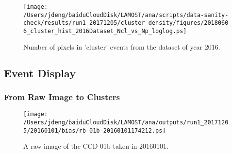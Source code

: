 \documentclass[12pt,twoside,letterpaper]{article}
\begin{document}
   \begin{figure}[!htbp]
   \begin{center}
       \texttt{[image: /Users/jdeng/baiduCloudDisk/LAMOST/ana/scripts/data-sanity-check/results/run1\_20171205/cluster\_density/figures/20180606\_cluster\_hist\_2016Dataset\_Ncl\_vs\_Np\_loglog.ps]}
       \caption{Number of pixels in 'cluster' events from the dataset of year 2016.}  
       \label{Fig:CluVsPix}
   \end{center}    
   \end{figure}


\subsection{Event Display} 
\subsubsection{From Raw Image to Clusters} 

   \begin{figure}[!htbp]
   \begin{center}
       \texttt{[image: /Users/jdeng/baiduCloudDisk/LAMOST/ana/outputs/run1\_20171205/20160101/bias/rb-01b-20160101174212.ps]}
       \caption{A raw image of the CCD 01b taken in 20160101.}
       \label{Fig:rawImage_01b}
   \end{center}    
   \end{figure}
\end{document}
